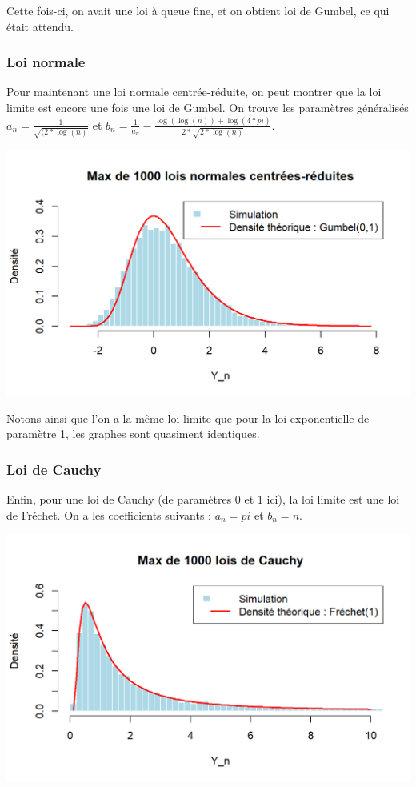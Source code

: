 \documentclass{article}
\theoremstyle{plain}
\theoremstyle{definition}
\theoremstyle{plain}
\begin{document}
\noindent Cette fois-ci, on avait une loi à queue fine, et on obtient loi de Gumbel, ce qui était attendu.

\subsubsection{Loi normale}

\noindent Pour maintenant une loi normale centrée-réduite, on peut montrer que la loi limite est encore une fois une loi de Gumbel. On trouve les paramètres généralisés $a_n = \frac{1}{\sqrt{(2*\log(n)}} $ et $b_n = \frac{1}{a_n} - \frac{\log(\log(n)) + \log(4 * pi)}{2 * \sqrt{2 * \log(n)}} $.

\begin{center}
	\includegraphics[scale=0.8]{./images/Max_Normale.png} 
\end{center}

\noindent Notons ainsi que l'on a la même loi limite que pour la loi exponentielle de paramètre 1, les graphes sont quasiment identiques.

\subsubsection{Loi de Cauchy}

\noindent Enfin, pour une loi de Cauchy (de paramètres 0 et 1 ici), la loi limite est une loi de Fréchet. On a les coefficients suivants : $a_n = pi $ et $b_n = n $.

\begin{center}
	\includegraphics[scale=0.8]{./images/Max_Cauchy.png} 
\end{center}
\end{document}
